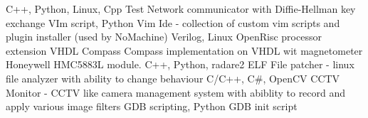 

\begin{cventries}

  \cventry
    {C++, Python, Linux, Cpp Test }
    {Network communicator with Diffie-Hellman key exchange} 
    {}
    {}
    {}
  \cventry
    {VIm script, Python}
    {Vim Ide - collection of custom vim scripts and plugin installer (used by NoMachine)}
    {}
    {}
    {}
  \cventry
    {Verilog, Linux}
    {OpenRisc processor extension}
    {}
    {}
    {}
  \cventry
    {VHDL}
    {Compass}
    {Compass implementation on VHDL wit magnetometer Honeywell HMC5883L module.}
  \cventry
    {C++, Python, radare2}
    {ELF File patcher - linux file analyzer with ability to change behaviour}
    {}
    {}
    {}
  \cventry
    {C/C++, C\#, OpenCV}
    {CCTV Monitor - CCTV like camera management system with abiblity to record and apply various image filters}
    {}
    {}
    {}
  \cventry
    {GDB scripting, Python}
    {GDB init script}
    {}
    {}
    {}
\end{cventries}
